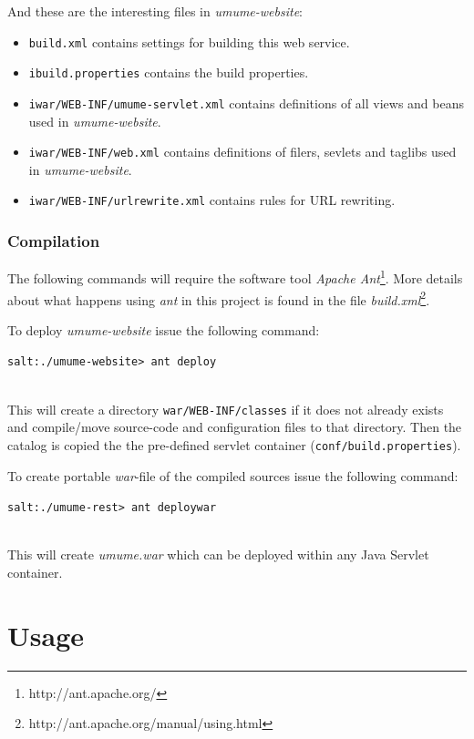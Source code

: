 \documentclass[titlepage, twocolumn, a4paper, 10pt]{article}
\begin{document}
And these are the interesting files in \textit{umume-website}:
\begin{itemize}
\item \verb!build.xml! contains settings for building this web service.
\item \verb!ibuild.properties! contains the build properties. 
\item \verb!iwar/WEB-INF/umume-servlet.xml! contains definitions of
all views and beans used in \textit{umume-website}.  
\item \verb!iwar/WEB-INF/web.xml! contains definitions of filers, sevlets and
taglibs used in \textit{umume-website}. 
\item \verb!iwar/WEB-INF/urlrewrite.xml! contains rules for URL rewriting. 
\end{itemize}

\subsubsection{Compilation}\label{sec:compilation-website}
The following commands will require the software tool \textit{Apache
  Ant}\footnote{http://ant.apache.org/}. More details about what
happens using \textit{ant} in this project is found in the file
\textit{build.xml}\footnote{http://ant.apache.org/manual/using.html}.

To deploy \textit{umume-website} issue the following command:\\
\begin{footnotesize}
  \verb!salt:./umume-website> ant deploy!
\end{footnotesize}\\
This will create a directory \verb!war/WEB-INF/classes! if it does not already exists
and compile/move source-code and configuration files to that
directory. Then the catalog is copied the the pre-defined servlet container
(\verb!conf/build.properties!).

To create portable \textit{war}-file of the compiled sources issue the
following command:\\
\begin{footnotesize}
  \verb!salt:./umume-rest> ant deploywar!
\end{footnotesize}\\
This will create \textit{umume.war} which can be deployed within
any Java Servlet container.



\section{Usage}\label{sec:usage}
\end{document}
